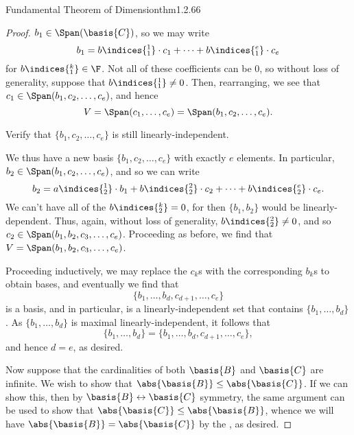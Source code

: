 \begin{thm}{Fundamental Theorem of Dimension}{thm1.2.66}
\begin{proof}
		$b_1\in \Span (\basis{C})$, so we may write
		\begin{equation}
			b_1=b\indices{^1_1}\cdot c_1+\cdots +b\indices{^e_1}\cdot c_e
		\end{equation}
		for $b\indices{^k_1}\in \F$.  Not all of these coefficients can be $0$, so without loss of generality, suppose that $b\indices{^1_1}\neq 0$.  Then, rearranging, we see that $c_1\in \Span (b_1,c_2,\ldots ,c_e)$, and hence
		\begin{equation}
			V=\Span (c_1,\ldots ,c_e)=\Span (b_1,c_2,\ldots ,c_e).
		\end{equation}
		\begin{exr}[breakable=false]{}{}
			Verify that $\{ b_1,c_2,\ldots ,c_e\}$ is still linearly-independent.
		\end{exr}
		We thus have a new basis $\{ b_1,c_2,\ldots ,c_e\}$ with exactly $e$ elements.  In particular, $b_2\in \Span (b_1,c_2,\ldots ,c_e)$, and so we can write
		\begin{equation}
			b_2=a\indices{^1_2}\cdot b_1+b\indices{^2_2}\cdot c_2+\cdots +b\indices{^e_2}\cdot c_e.
		\end{equation}
		We can't have all of the $b\indices{^k_2}=0$, for then $\{ b_1,b_2\}$ would be linearly-dependent.  Thus, again, without loss of generality, $b\indices{^2_2}\neq 0$, and so $c_2\in \Span (b_1,b_2,c_3,\ldots ,c_e)$.  Proceeding as before, we find that $V=\Span (b_1,b_2,c_3,\ldots ,c_e)$.
		
		Proceeding inductively, we may replace the $c_k$s with the corresponding $b_k$s to obtain bases, and eventually we find that
		\begin{equation}
			\{ b_1,\ldots ,b_d,c_{d+1},\ldots ,c_e\}
		\end{equation}
		is a basis, and in particular, is a linearly-independent set that contains $\{ b_1,\ldots ,b_d\}$.  As $\{ b_1,\ldots ,b_d\}$ is maximal linearly-independent, it follows that
		\begin{equation}
			\{ b_1,\ldots ,b_d\} =\{ b_1,\ldots ,b_d,c_{d+1},\ldots ,c_e\} ,
		\end{equation}
		and hence $d=e$, as desired.
		
		Now suppose that the cardinalities of both $\basis{B}$ and $\basis{C}$ are infinite.  We wish to show that $\abs{\basis{B}}\leq \abs{\basis{C}}$.  If we can show this, then by $\basis{B}\leftrightarrow \basis{C}$ symmetry, the same argument can be used to show that $\abs{\basis{C}}\leq \abs{\basis{B}}$, whence we will have $\abs{\basis{B}}=\abs{\basis{C}}$ by the , as desired.
		

\end{proof}
\end{thm}
